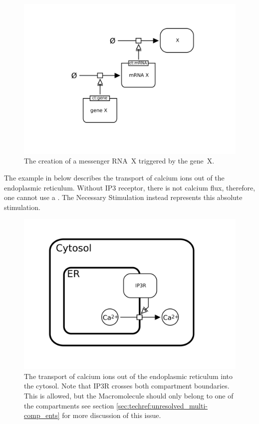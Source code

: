 \begin{figure}[htb]
  \centering
  \includegraphics[scale = 0.4]{examples/necessary_stim-genetic}
  \caption{The creation of a messenger RNA~X triggered by the gene~X.}
  \label{fig:techref:necessary_stim-gene}
\end{figure}


The example in  below describes the
transport of calcium ions out of the endoplasmic reticulum. Without
IP3 receptor, there is not calcium flux, therefore, one cannot use a
. The Necessary Stimulation instead represents this
absolute stimulation.

\begin{figure}[htb]
  \centering
  \includegraphics[scale = 0.3]{examples/necessary_stim-transport}
  \caption{The transport of calcium ions out of the endoplasmic
    reticulum into the cytosol. Note that IP3R crosses both
    compartment boundaries. This is allowed, but the Macromolecule
    should only belong to one of the compartments see section
    \ref{sec:techref:unresolved_multi-comp_ents} for more discussion of this
    issue.}
  \label{fig:techref:necessary_stim-calcium}
\end{figure}

